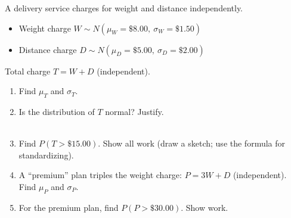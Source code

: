 \documentclass[10pt]{article}
\begin{document}
\begin{tcolorbox}[colback=greenbg!60, colframe=greenacc, title=\textbf{Tier E --- Extension},
    arc=2mm, boxrule=0.8pt, left=4mm, right=4mm, top=3mm, bottom=3mm]
\small
A delivery service charges for weight and distance independently.
\begin{itemize}[leftmargin=1.5em, itemsep=2pt]
  \item Weight charge $W \sim N(\mu_W = \$8.00,\ \sigma_W = \$1.50)$
  \item Distance charge $D \sim N(\mu_D = \$5.00,\ \sigma_D = \$2.00)$
\end{itemize}
Total charge $T = W + D$ (independent).

\begin{enumerate}[leftmargin=1.5em, itemsep=10pt]
  \item Find $\mu_T$ and $\sigma_T$.

        \vspace{0.3in}

  \item Is the distribution of $T$ normal? Justify.\\
        \writeline\\[1pt]\writeline

  \item Find $P(T > \$15.00)$. Show all work (draw a sketch; use the formula for standardizing).

        \vspace{0.5in}

  \item A ``premium'' plan triples the weight charge: $P = 3W + D$ (independent).
        Find $\mu_P$ and $\sigma_P$.

        \vspace{0.3in}

  \item For the premium plan, find $P(P > \$30.00)$. Show work.

        \vspace{0.5in}
\end{enumerate}
\end{tcolorbox}
\end{document}
